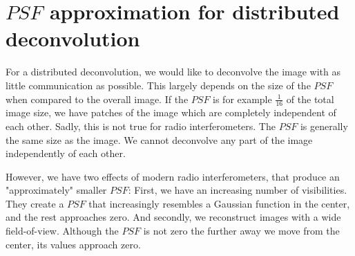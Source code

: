 \section{$PSF$ approximation for distributed deconvolution} \label{gradients}
For a distributed deconvolution, we would like to deconvolve the image with as little communication as possible. This largely depends on the size of the $PSF$ when compared to the overall image. If the $PSF$ is for example $\frac{1}{16}$ of the total image size, we have patches of the image which are completely independent of each other. Sadly, this is not true for radio interferometers. The $PSF$ is generally the same size as the image. We cannot deconvolve any part of the image independently of each other.

However, we have two effects of modern radio interferometers, that produce an "approximately" smaller $PSF$: First, we have an increasing number of visibilities. They create a $PSF$ that increasingly resembles a Gaussian function in the center, and the rest approaches zero. And secondly, we reconstruct images with a wide field-of-view. Although the $PSF$ is not zero the further away we move from the center, its values approach zero.

